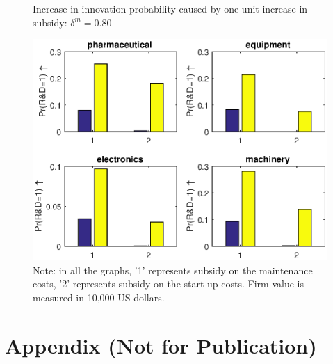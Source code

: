 \documentclass[English]{article}
\begin{document}
\begin{center}
\begin{figure}[H]
\caption{Increase in innovation probability caused by one unit increase in subsidy: $\delta^m=0.80$}
\label{F9}
\begin{centering}
\includegraphics[width=1\textwidth]{probchangePerUnit.eps}
\par\end{centering}
\caption*{\small{}Note: in all the graphs, '1' represents subsidy on the maintenance costs, '2' represents subsidy on the start-up costs. Firm value is measured in 10,000 US dollars.}{\small \par}
\end{figure}
\par\end{center}




\newpage
\setcounter{section}{0}
\renewcommand*{\thesection}{\Alph{section}}
\section*{Appendix (Not for Publication)}
\setcounter{equation}{0}
\end{document}
